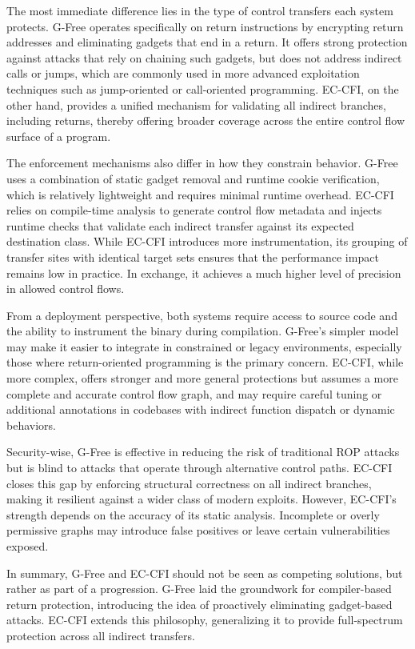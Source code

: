 \documentclass[a4paper]{usiinfbachelorproject}
\begin{document}
The most immediate difference lies in the type of control transfers each system protects. G-Free operates specifically on return instructions by encrypting return addresses and eliminating gadgets that end in a return. It offers strong protection against attacks that rely on chaining such gadgets, but does not address indirect calls or jumps, which are commonly used in more advanced exploitation techniques such as jump-oriented or call-oriented programming. EC-CFI, on the other hand, provides a unified mechanism for validating all indirect branches, including returns, thereby offering broader coverage across the entire control flow surface of a program.

The enforcement mechanisms also differ in how they constrain behavior. G-Free uses a combination of static gadget removal and runtime cookie verification, which is relatively lightweight and requires minimal runtime overhead. EC-CFI relies on compile-time analysis to generate control flow metadata and injects runtime checks that validate each indirect transfer against its expected destination class. While EC-CFI introduces more instrumentation, its grouping of transfer sites with identical target sets ensures that the performance impact remains low in practice. In exchange, it achieves a much higher level of precision in allowed control flows.

From a deployment perspective, both systems require access to source code and the ability to instrument the binary during compilation. G-Free’s simpler model may make it easier to integrate in constrained or legacy environments, especially those where return-oriented programming is the primary concern. EC-CFI, while more complex, offers stronger and more general protections but assumes a more complete and accurate control flow graph, and may require careful tuning or additional annotations in codebases with indirect function dispatch or dynamic behaviors.

Security-wise, G-Free is effective in reducing the risk of traditional ROP attacks but is blind to attacks that operate through alternative control paths. EC-CFI closes this gap by enforcing structural correctness on all indirect branches, making it resilient against a wider class of modern exploits. However, EC-CFI’s strength depends on the accuracy of its static analysis. Incomplete or overly permissive graphs may introduce false positives or leave certain vulnerabilities exposed.

In summary, G-Free and EC-CFI should not be seen as competing solutions, but rather as part of a progression. G-Free laid the groundwork for compiler-based return protection, introducing the idea of proactively eliminating gadget-based attacks. EC-CFI extends this philosophy, generalizing it to provide full-spectrum protection across all indirect transfers.
\end{document}

